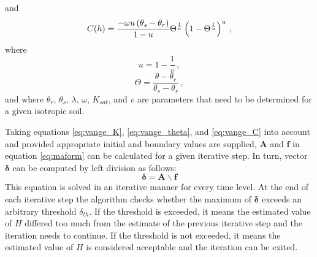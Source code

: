 and
\begin{equation}
  \label{eq:vange_C}
  C(h) = \frac{-\omega u \del{ \theta_s - \theta_r }}{1 - u} \Theta^{\frac{1}{u}} \del{ 1 - \Theta^{\frac{1}{u}} }^u \, ,
\end{equation}
where
\begin{equation*}
  u = 1 - \frac{1}{v} \, ,
\end{equation*}
\begin{equation*}
  \Theta = \frac{\theta - \theta_r}{\theta_s - \theta_r} \, ,
\end{equation*}
and where $\theta_r$, $\theta_s$, $\lambda$, $\omega$, $K_{sat}$, and $v$ are parameters that need to be determined for a given isotropic soil.

Taking equations \eqref{eq:vange_K}, \eqref{eq:vange_theta}, and \eqref{eq:vange_C} into account and provided appropriate initial and boundary values are supplied, $\mathbf{A}$ and $\mathbf{f}$ in equation \eqref{eq:maform} can be calculated for a given iterative step.  In turn, vector $\boldsymbol{\delta}$ can be computed by left division as follows:
\begin{equation}
  \label{eq:maform_ledi}
  \boldsymbol{\delta} = \mathbf{A \backslash f}
\end{equation}
This equation is solved in an iterative manner for every time level.  At the end of each iterative step the algorithm checks whether the maximum of $\boldsymbol{\delta}$ exceeds an arbitrary threshold $\delta_{th}$.
If the threshold is exceeded, it means the estimated value of $H$ differed too much from the estimate of the previous iterative step and the iteration needs to continue.
If the threshold is not exceeded, it means the estimated value of $H$ is considered acceptable and the iteration can be exited.

